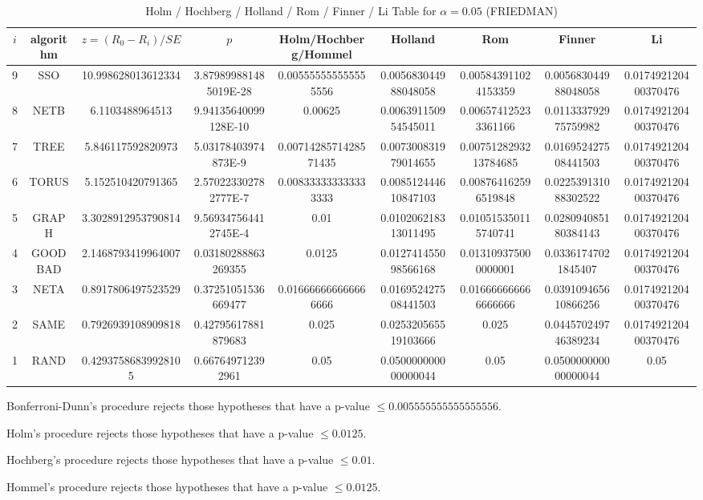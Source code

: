 \documentclass[a4paper,10pt]{article}
\begin{document}
\begin{landscape}
\begin{table}[!htp]
\centering\scriptsize
\caption{Holm / Hochberg / Holland / Rom / Finner / Li Table for $\alpha=0.05$ (FRIEDMAN)}
\begin{tabular}{ccccccccc}
$i$&algorithm&$z=(R_0 - R_i)/SE$&$p$&Holm/Hochberg/Hommel&Holland&Rom&Finner&Li\\
\hline
9& SSO&10.998628013612334&3.879899881485019E-28&0.005555555555555556&0.005683044988048058&0.005843911024153359&0.005683044988048058&0.017492120400370476\\
8& NETB&6.1103488964513&9.94135640099128E-10&0.00625&0.006391150954545011&0.006574125233361166&0.011333792975759982&0.017492120400370476\\
7& TREE&5.846117592820973&5.03178403974873E-9&0.0071428571428571435&0.007300831979014655&0.0075128293213784685&0.016952427508441503&0.017492120400370476\\
6& TORUS&5.152510420791365&2.570223302782777E-7&0.008333333333333333&0.008512444610847103&0.008764162596519848&0.022539131088302522&0.017492120400370476\\
5& GRAPH&3.3028912953790814&9.569347564412745E-4&0.01&0.010206218313011495&0.010515350115740741&0.028094085180384143&0.017492120400370476\\
4& GOODBAD&2.1468793419964007&0.03180288863269355&0.0125&0.012741455098566168&0.013109375000000001&0.03361747021845407&0.017492120400370476\\
3& NETA&0.8917806497523529&0.37251051536669477&0.016666666666666666&0.016952427508441503&0.016666666666666666&0.039109465610866256&0.017492120400370476\\
2& SAME&0.7926939108909818&0.42795617881879683&0.025&0.025320565519103666&0.025&0.044570249746389234&0.017492120400370476\\
1& RAND&0.42937586839928105&0.667649712392961&0.05&0.050000000000000044&0.05&0.050000000000000044&0.05\\
\hline
\end{tabular}
\end{table}
Bonferroni-Dunn's procedure rejects those hypotheses that have a p-value $\le0.005555555555555556$.


Holm's procedure rejects those hypotheses that have a p-value $\le0.0125$.


Hochberg's procedure rejects those hypotheses that have a p-value $\le0.01$.


Hommel's procedure rejects those hypotheses that have a p-value $\le0.0125$.



\end{landscape}
\end{document}
